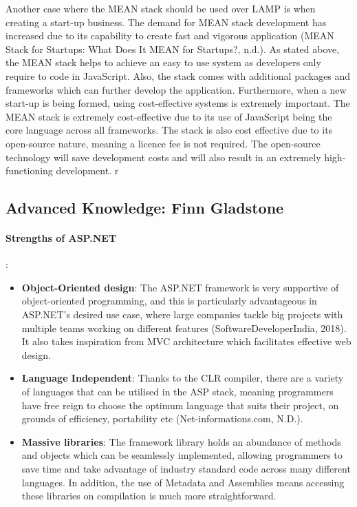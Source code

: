 \documentclass[a4paper, 11pt]{report}
\begin{document}
Another case where the MEAN stack should be used over LAMP is when creating a start-up business. The demand for MEAN stack development has increased due to its capability to create fast and vigorous application (MEAN Stack for Startups: What Does It MEAN for Startups?, n.d.). As stated above, the MEAN stack helps to achieve an easy to use system as developers only require to code in JavaScript. Also, the stack comes with additional packages and frameworks which can further develop the application. Furthermore, when a new start-up is being formed, using cost-effective systems is extremely important. The MEAN stack is extremely cost-effective due to its use of JavaScript being the core language across all frameworks. The stack is also cost effective due to its open-source nature, meaning a licence fee is not required. The open-source technology will save development costs and will also result in an extremely high-functioning development.   r
	
	
	\subsection{Advanced Knowledge: Finn Gladstone}

	\paragraph{Strengths of ASP.NET}:
	\begin{itemize}
	    \item \textbf{Object-Oriented design}: The ASP.NET framework is very supportive of object-oriented programming, and this is particularly advantageous in ASP.NET's desired use case, where large companies tackle big projects with multiple teams working on different features (SoftwareDeveloperIndia, 2018). It also takes inspiration from MVC architecture which facilitates effective web design.

	    \item \textbf{Language Independent}: Thanks to the CLR compiler, there are a variety of languages that can be utilised in the ASP stack, meaning programmers have free reign to choose the optimum language that suits their project, on grounds of efficiency, portability etc (Net-informations.com, N.D.).

	    \item \textbf{Massive libraries}: The framework library holds an abundance of methods and objects which can be seamlessly implemented, allowing programmers to save time and take advantage of industry standard code across many different languages. In addition, the use of Metadata and Assemblies means accessing these libraries on compilation is much more straightforward.

    \end{itemize}
\end{document}
